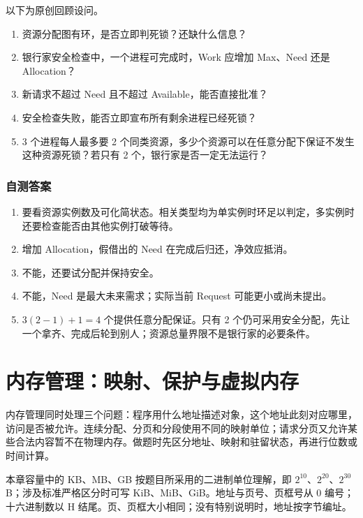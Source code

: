 以下为原创回顾设问。

\begin{enumerate}
\def\labelenumi{\arabic{enumi}.}
\tightlist
\item
  资源分配图有环，是否立即判死锁？还缺什么信息？
\item
  银行家安全检查中，一个进程可完成时，Work 应增加 Max、Need 还是 Allocation？
\item
  新请求不超过 Need 且不超过 Available，能否直接批准？
\item
  安全检查失败，能否立即宣布所有剩余进程已经死锁？
\item
  3 个进程每人最多要 2 个同类资源，多少个资源可以在任意分配下保证不发生这种资源死锁？若只有 2 个，银行家是否一定无法运行？
\end{enumerate}

\subsection{自测答案}\label{os-c04-h185}

\begin{enumerate}
\def\labelenumi{\arabic{enumi}.}
\tightlist
\item
  要看资源实例数及可化简状态。相关类型均为单实例时环足以判定，多实例时还要检查能否由其他实例打破等待。
\item
  增加 Allocation，假借出的 Need 在完成后归还，净效应抵消。
\item
  不能，还要试分配并保持安全。
\item
  不能，Need 是最大未来需求；实际当前 Request 可能更小或尚未提出。
\item
  \(3(2-1)+1=4\) 个提供任意分配保证。只有 2 个仍可采用安全分配，先让一个拿齐、完成后轮到别人；资源总量界限不是银行家的必要条件。
\end{enumerate}

\chapter{内存管理：映射、保护与虚拟内存}\label{os-ch5}

内存管理同时处理三个问题：程序用什么地址描述对象，这个地址此刻对应哪里，访问是否被允许。连续分配、分页和分段使用不同的映射单位；请求分页又允许某些合法内容暂不在物理内存。做题时先区分地址、映射和驻留状态，再进行位数或时间计算。

本章容量中的 KB、MB、GB 按题目所采用的二进制单位理解，即 \(2^{10}\)、\(2^{20}\)、\(2^{30}\) B；涉及标准严格区分时可写 KiB、MiB、GiB。地址与页号、页框号从 0 编号；十六进制数以 H 结尾。页、页框大小相同；没有特别说明时，地址按字节编址。

